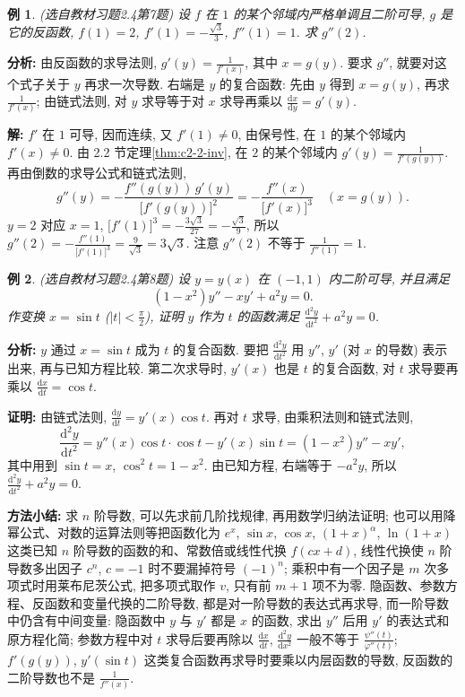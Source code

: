 \documentclass[UTF8,openany]{ctexbook}
\theoremstyle{chinesetextbook}
\newtheorem{example}{例}[section]
\newenvironment{cnproof}{\par\indent\textbf{证明:} \ignorespaces}{\par}
\newenvironment{cnsolution}{\par\indent\textbf{解:} \ignorespaces}{\par}
\newcommand{\dd}{\mathrm d}
\begin{document}
\begin{example}\label{ex:c2-h4-7}
\textnormal{(选自教材习题2.4第7题)} 设 $f$ 在 $1$ 的某个邻域内严格单调且二阶可导, $g$ 是它的反函数, $f(1)=2$, $\displaystyle f'(1)=-\frac{\sqrt3}3$, $f''(1)=1$. 求 $g''(2)$.
\end{example}
\par\indent\textbf{分析:} 由反函数的求导法则, $\displaystyle g'(y)=\frac1{f'(x)}$, 其中 $x=g(y)$. 要求 $g''$, 就要对这个式子关于 $y$ 再求一次导数. 右端是 $y$ 的复合函数: 先由 $y$ 得到 $x=g(y)$, 再求 $\displaystyle\frac1{f'(x)}$; 由链式法则, 对 $y$ 求导等于对 $x$ 求导再乘以 $\displaystyle\frac{\dd x}{\dd y}=g'(y)$.
\begin{cnsolution}
$f'$ 在 $1$ 可导, 因而连续, 又 $f'(1)\ne0$, 由保号性, 在 $1$ 的某个邻域内 $f'(x)\ne0$. 由 2.2 节定理\ref{thm:c2-2-inv}, 在 $2$ 的某个邻域内 $\displaystyle g'(y)=\frac1{f'(g(y))}$. 再由倒数的求导公式和链式法则,
\[
g''(y)=-\frac{f''(g(y))\,g'(y)}{\bigl[f'(g(y))\bigr]^2}=-\frac{f''(x)}{\bigl[f'(x)\bigr]^3}\quad(x=g(y)).
\]
$y=2$ 对应 $x=1$, $\displaystyle\bigl[f'(1)\bigr]^3=-\frac{3\sqrt3}{27}=-\frac{\sqrt3}9$, 所以 $\displaystyle g''(2)=-\frac{f''(1)}{\bigl[f'(1)\bigr]^3}=\frac9{\sqrt3}=3\sqrt3$. 注意 $g''(2)$ 不等于 $\displaystyle\frac1{f''(1)}=1$.
\end{cnsolution}
\begin{example}\label{ex:c2-h4-8}
\textnormal{(选自教材习题2.4第8题)} 设 $y=y(x)$ 在 $(-1,1)$ 内二阶可导, 并且满足
\[
(1-x^2)y''-xy'+a^2y=0.
\]
作变换 $x=\sin t$ ($\displaystyle|t|<\frac\pi2$), 证明 $y$ 作为 $t$ 的函数满足 $\displaystyle\frac{\dd^2y}{\dd t^2}+a^2y=0$.
\end{example}
\par\indent\textbf{分析:} $y$ 通过 $x=\sin t$ 成为 $t$ 的复合函数. 要把 $\displaystyle\frac{\dd^2y}{\dd t^2}$ 用 $y''$, $y'$ (对 $x$ 的导数) 表示出来, 再与已知方程比较. 第二次求导时, $y'(x)$ 也是 $t$ 的复合函数, 对 $t$ 求导要再乘以 $\displaystyle\frac{\dd x}{\dd t}=\cos t$.
\begin{cnproof}
由链式法则, $\displaystyle\frac{\dd y}{\dd t}=y'(x)\cos t$. 再对 $t$ 求导, 由乘积法则和链式法则,
\[
\frac{\dd^2y}{\dd t^2}=y''(x)\cos t\cdot\cos t-y'(x)\sin t=(1-x^2)y''-xy',
\]
其中用到 $\sin t=x$, $\cos^2t=1-x^2$. 由已知方程, 右端等于 $-a^2y$, 所以 $\displaystyle\frac{\dd^2y}{\dd t^2}+a^2y=0$.
\end{cnproof}
\par\indent\textbf{方法小结:} 求 $n$ 阶导数, 可以先求前几阶找规律, 再用数学归纳法证明; 也可以用降幂公式、对数的运算法则等把函数化为 $e^x$, $\sin x$, $\cos x$, $(1+x)^\alpha$, $\ln(1+x)$ 这类已知 $n$ 阶导数的函数的和、常数倍或线性代换 $f(cx+d)$, 线性代换使 $n$ 阶导数多出因子 $c^n$, $c=-1$ 时不要漏掉符号 $(-1)^n$; 乘积中有一个因子是 $m$ 次多项式时用莱布尼茨公式, 把多项式取作 $v$, 只有前 $m+1$ 项不为零. 隐函数、参数方程、反函数和变量代换的二阶导数, 都是对一阶导数的表达式再求导, 而一阶导数中仍含有中间变量: 隐函数中 $y$ 与 $y'$ 都是 $x$ 的函数, 求出 $y''$ 后用 $y'$ 的表达式和原方程化简; 参数方程中对 $t$ 求导后要再除以 $\displaystyle\frac{\dd x}{\dd t}$, $\displaystyle\frac{\dd^2y}{\dd x^2}$ 一般不等于 $\displaystyle\frac{\psi''(t)}{\varphi''(t)}$; $f'(g(y))$, $y'(\sin t)$ 这类复合函数再求导时要乘以内层函数的导数, 反函数的二阶导数也不是 $\displaystyle\frac1{f''(x)}$.
\end{document}
